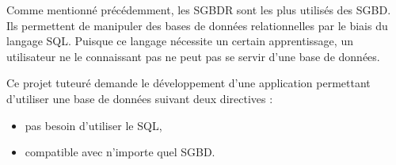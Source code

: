 Comme mentionné précédemment, les SGBDR sont les plus utilisés des SGBD. Ils permettent de manipuler des bases de données relationnelles
par le biais du langage SQL. Puisque ce langage nécessite un certain apprentissage, un utilisateur ne le connaissant pas ne peut pas se servir
d'une base de données.

Ce projet tuteuré demande le développement d'une application permettant d'utiliser une base de données suivant deux directives :
\begin{itemize}
\item pas besoin d'utiliser le SQL,
\item compatible avec n'importe quel SGBD.
\end{itemize}

